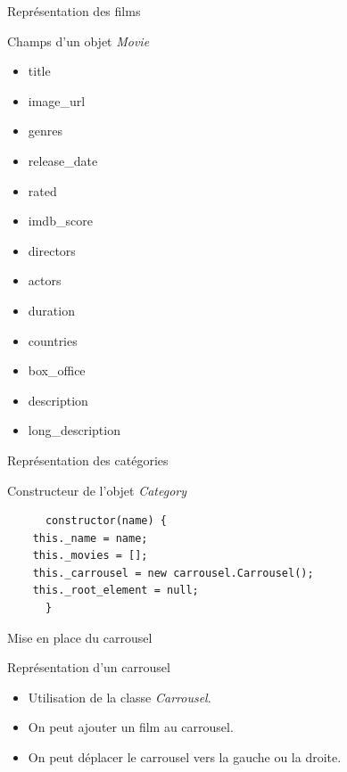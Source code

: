 \begin{frame}{Représentation des films}
  \begin{block}{Champs d'un objet \textit{Movie}}
    \tiny
    \begin{itemize}
    \item title
    \item image\_url
    \item genres
    \item release\_date
    \item rated
    \item imdb\_score
    \item directors
    \item actors
    \item duration
    \item countries
    \item box\_office		
    \item description
    \item long\_description
    \end{itemize}
  \end{block}
\end{frame}

\begin{frame}[fragile]{Représentation des catégories}
  \begin{block}{Constructeur de l'objet \textit{Category}}
    \begin{verbatim}
      constructor(name) {
	this._name = name;
	this._movies = [];
	this._carrousel = new carrousel.Carrousel();
	this._root_element = null;
      }
    \end{verbatim}
  \end{block}
\end{frame}

\begin{frame}[fragile]{Mise en place du carrousel}

  \begin{block}{Représentation d'un carrousel}
    \begin{itemize}
    \item Utilisation de la classe \textit{Carrousel}.
    \item On peut ajouter un film au carrousel.
    \item On peut déplacer le carrousel vers la gauche ou la droite.
    \end{itemize}
  \end{block}
\end{frame}

